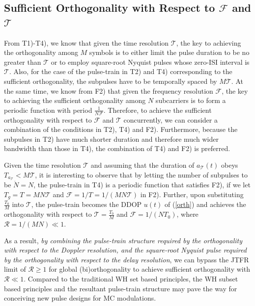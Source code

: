 \documentclass[journal]{IEEEtran}
\begin{document}
\subsection{Sufficient Orthogonality with Respect to $\mathcal F$ and $\mathcal T$}
From T1)-T4), we know that given the time resolution $\mathcal T$, the key to achieving the orthogonality among $M$ symbols is to either limit the pulse duration to be {no} greater than $\mathcal T$ or to employ square-root Nyquist pulses whose zero-ISI interval is $\mathcal T$. Also, for the case of the pulse-train in T2) and T4) corresponding to the sufficient orthogonality, the subpulses have to be temporally spaced by $M\mathcal T$. At the same time, we know from F2) that given the frequency resolution $\mathcal F$, the key to achieving the sufficient orthogonality among $N$ subcarriers is to form a periodic function with period $\frac{1}{N\mathcal F}$. Therefore, to achieve the sufficient orthogonality with respect to $\mathcal F$ and $\mathcal T$ concurrently, we can consider a combination of the conditions in T2), T4) and F2). Furthermore, because the subpulses in T2) have much shorter duration and therefore much wider bandwidth than those in T4), the combination of T4) and F2) is preferred.

Given the time resolution $\mathcal T$ and assuming that the duration of $a_{\mathcal T}(t)$ obeys $T_{a_{\mathcal T}} < M\mathcal T$, it is interesting to observe that by letting the number of subpulses to be $\dot N=N$, the pulse-train in T4) is a periodic function that satisfies F2), if we let $T_g=T=MN\mathcal T$ and $\mathcal F =1/T=1/(MN\mathcal T)$ in F2).
Further, upon substituting $\frac{T_0}{M}$ into $\mathcal T$, the pulse-train becomes the DDOP $u(t)$ of (\ref{orth}) and achieves the orthogonality with respect to $\mathcal T=\frac{T_0}{M}$ and $\mathcal F =1/(N T_0)$, where $\mathcal R =1/(MN) \ll 1$.

As a result, \emph{by combining the pulse-train structure required by the orthogonality with respect to the Doppler resolution, {and} the square-root Nyquist pulse required by the orthogonality with respect to the delay resolution}, we can bypass the JTFR limit of $\mathcal R\ge 1$ for global (bi)orthogonality to achieve sufficient orthogonality with $\mathcal R \ll 1$.
Compared to the traditional WH set based principles, the WH subset based principles and the resultant pulse-train structure may pave the way for conceiving new pulse designs for MC modulations.
\end{document}
